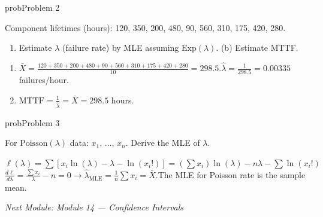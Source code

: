 \begin{PSbox}[unbreakable]{prob}{Problem 2}

Component lifetimes (hours): 120, 350, 200, 480, 90, 560, 310, 175, 420, 280.

\begin{enumerate}
\def\labelenumi{(\alph{enumi})}
\tightlist
\item
  Estimate $\lambda$ (failure rate) by MLE assuming $\mathrm{Exp}(\lambda)$. (b) Estimate MTTF.
\end{enumerate}

\PSsolution{} 

\begin{enumerate}
\def\labelenumi{(\alph{enumi})}
\tightlist
\item
  $\displaystyle \bar{X} = \frac{120+350+200+480+90+560+310+175+420+280}{10} = 298.5$.\PSbr{}$\hat{\lambda} = \frac{1}{298.5} = 0.00335$ failures/hour.
\item
  $\mathrm{MTTF} = \frac{1}{\hat{\lambda}} = \bar{X} = 298.5$ hours.
\end{enumerate}

\end{PSbox}

\begin{PSbox}[unbreakable]{prob}{Problem 3}

For $\mathrm{Poisson}(\lambda)$ data: $x_{1},\,\ldots,\,x_{n}$. Derive the MLE of $\lambda$.

\PSsolution{} $\ell (\lambda) = \sum [x_{i} \ln (\lambda) - \lambda - \ln (x_{i}!)] = \left(\sum x_{i}\right)\ln (\lambda) - n\lambda - \sum \ln (x_{i}!)$\PSbr{}$\displaystyle \frac{d\ell}{d\lambda} = \frac{\sum x_{i}}{\lambda} - n = 0 \to \hat{\lambda}_{\mathrm{MLE}} = \frac{1}{n}\sum x_{i} = \bar{X}$.\PSbr{}The MLE for Poisson rate is the sample mean.

\emph{Next Module: {Module 14 — Confidence Intervals}}

\end{PSbox}
